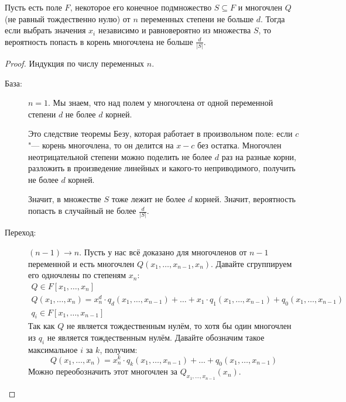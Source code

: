 	\begin{lemma}
		Пусть есть поле $F$, некоторое его конечное подмножество $S \subseteq F$ и многочлен $Q$ (не равный тождественно нулю) от $n$ переменных степени не больше $d$.
		Тогда если выбрать значения $x_i$ независимо и равновероятно из множества $S$, то вероятность попасть в корень многочлена не больше $\frac{d}{|S|}$.
	\end{lemma}
	\begin{proof}
		Индукция по числу переменных $n$.
		\begin{description}
			\item[База:] $n=1$.
				Мы знаем, что над полем у многочлена от одной переменной степени $d$ не более $d$ корней.
				\begin{Rem}
					Это следствие теоремы Безу, которая работает в произвольном поле: если $c$ "--- корень многочлена, то он делится на $x-c$ без остатка.
					Многочлен неотрицательной степени можно поделить не более $d$ раз на разные корни, разложить в произведение линейных и какого-то неприводимого,
					получить не более $d$ корней.
				\end{Rem}
				Значит, в множестве $S$ тоже лежит не более $d$ корней.
				Значит, вероятность попасть в случайный не более $\frac{d}{|S|}$.
			\item[Переход:] $(n-1) \to n$.
				Пусть у нас всё доказано для многочленов от $n-1$ переменной и есть многочлен $Q(x_1, \dots, x_{n-1}, x_n)$.
				Давайте сгруппируем его одночлены по степеням $x_n$:
				\begin{gather*}
					Q \in F[x_1, \dots, x_n] \\
					Q(x_1, \dots, x_n) = x_n^d \cdot q_d(x_1, \dots, x_{n-1}) + \dots + x_1 \cdot q_1(x_1, \dots, x_{n-1}) + q_0(x_1, \dots, x_{n-1}) \\
					q_i \in F[x_1, \dots, x_{n-1}]
				\end{gather*}
				Так как $Q$ не является тождественным нулём, то хотя бы один многочлен из $q_i$ не является тождественным нулём.
				Давайте обозначим такое максимальное $i$ за $k$, получим:
				\[
					Q(x_1, \dots, x_n) = x_n^k \cdot q_k(x_1, \dots, x_{n-1}) + \dots + q_0(x_1, \dots, x_{n-1})
				\]
				Можно переобозначить этот многочлен за $Q_{x_1,\dots, x_{n-1}}(x_n)$.


\end{description}
\end{proof}
